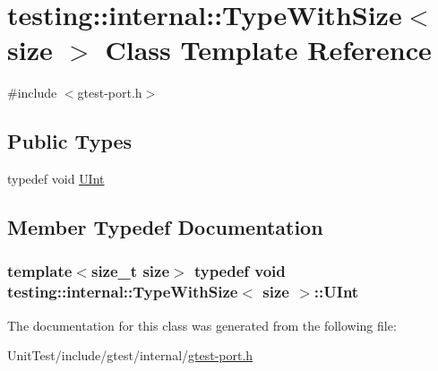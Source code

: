 \hypertarget{classtesting_1_1internal_1_1_type_with_size}{\section{testing\+:\+:internal\+:\+:Type\+With\+Size$<$ size $>$ Class Template Reference}
\label{classtesting_1_1internal_1_1_type_with_size}
}


{\ttfamily \#include $<$gtest-\/port.\+h$>$}

\subsection*{Public Types}
\begin{DoxyCompactItemize}
\item 
typedef void \hyperlink{classtesting_1_1internal_1_1_type_with_size_a3898640d9f6c1e18110eef90f47a5d7b}{U\+Int}
\end{DoxyCompactItemize}


\subsection{Member Typedef Documentation}
\hypertarget{classtesting_1_1internal_1_1_type_with_size_a3898640d9f6c1e18110eef90f47a5d7b}{
\subsubsection[{U\+Int}]{\setlength{\rightskip}{0pt plus 5cm}template$<$size\+\_\+t size$>$ typedef void {\bf testing\+::internal\+::\+Type\+With\+Size}$<$ size $>$\+::{\bf U\+Int}}}\label{classtesting_1_1internal_1_1_type_with_size_a3898640d9f6c1e18110eef90f47a5d7b}


The documentation for this class was generated from the following file\+:\begin{DoxyCompactItemize}
\item 
Unit\+Test/include/gtest/internal/\hyperlink{gtest-port_8h}{gtest-\/port.\+h}\end{DoxyCompactItemize}

